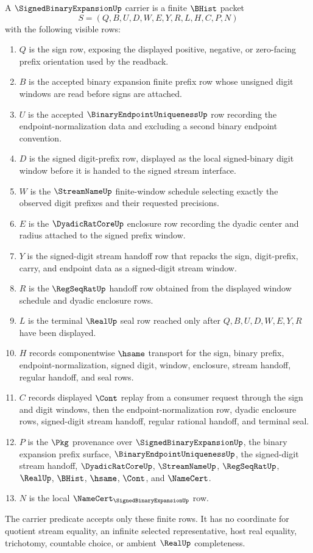 \begin{definition}
\label{def:signed-binary-expansion-carrier}
A $\SignedBinaryExpansionUp$ carrier is a finite $\BHist$ packet
$$
S=(Q,B,U,D,W,E,Y,R,L,H,C,P,N)
$$
with the following visible rows:
\begin{enumerate}
\item $Q$ is the sign row, exposing the displayed positive, negative, or zero-facing prefix orientation used by the readback.
\item $B$ is the accepted binary expansion finite prefix row whose unsigned digit windows are read before signs are attached.
\item $U$ is the accepted $\BinaryEndpointUniquenessUp$ row recording the endpoint-normalization data and excluding a second binary endpoint convention.
\item $D$ is the signed digit-prefix row, displayed as the local signed-binary digit window before it is handed to the signed stream interface.
\item $W$ is the $\StreamNameUp$ finite-window schedule selecting exactly the observed digit prefixes and their requested precisions.
\item $E$ is the $\DyadicRatCoreUp$ enclosure row recording the dyadic center and radius attached to the signed prefix window.
\item $Y$ is the signed-digit stream handoff row that repacks the sign, digit-prefix, carry, and endpoint data as a signed-digit stream window.
\item $R$ is the $\RegSeqRatUp$ handoff row obtained from the displayed window schedule and dyadic enclosure rows.
\item $L$ is the terminal $\RealUp$ seal row reached only after $Q,B,U,D,W,E,Y,R$ have been displayed.
\item $H$ records componentwise $\hsame$ transport for the sign, binary prefix, endpoint-normalization, signed digit, window, enclosure, stream handoff, regular handoff, and seal rows.
\item $C$ records displayed $\Cont$ replay from a consumer request through the sign and digit windows, then the endpoint-normalization row, dyadic enclosure rows, signed-digit stream handoff, regular rational handoff, and terminal seal.
\item $P$ is the $\Pkg$ provenance over $\SignedBinaryExpansionUp$, the binary expansion prefix surface, $\BinaryEndpointUniquenessUp$, the signed-digit stream handoff, $\DyadicRatCoreUp$, $\StreamNameUp$, $\RegSeqRatUp$, $\RealUp$, $\BHist$, $\hsame$, $\Cont$, and $\NameCert$.
\item $N$ is the local $\NameCert_{\SignedBinaryExpansionUp}$ row.
\end{enumerate}
The carrier predicate accepts only these finite rows. It has no coordinate for quotient stream equality, an infinite selected representative, host real equality, trichotomy, countable choice, or ambient $\RealUp$ completeness.
\end{definition}

